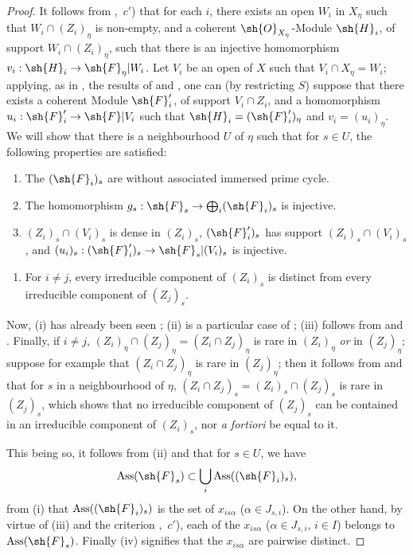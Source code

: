 \begin{proof}
\label{IV.9.8.3-proof}
It follows from ,~$c'$) that for each $i$, there exists an open $W_i$ in $X_\eta$ such that $W_i\cap(Z_i)_\eta$ is non-empty, and a coherent $\sh{O}_{X_\eta}$-Module $\sh{H}_i$, of support $W_i\cap(Z_i)_\eta$, such that there is an injective homomorphism $v_i:\sh{H}_i\to\sh{F}_\eta|W_i$.
Let $V_i$ be an open of $X$ such that $V_i\cap X_\eta=W_i$; applying, as in , the results of  and , one can (by restricting $S$) suppose that there exists a coherent Module $\sh{F}'_i$, of support $V_i\cap Z_i$, and a homomorphism $u_i:\sh{F}'_i\to\sh{F}|V_i$ such that $\sh{H}_i=(\sh{F}'_i)_\eta$ and $v_i=(u_i)_\eta$.
We will show that there is a neighbourhood $U$ of $\eta$ such that for $s\in U$, the following properties are satisfied:
\begin{enumerate}[label=(\roman*)]
  \item The $(\sh{F}_i)_s$ are without associated immersed prime cycle.
  \item The homomorphism $g_s:\sh{F}_s\to\bigoplus_i(\sh{F}_i)_s$ is injective.
  \item $(Z_i)_s\cap(V_i)_s$ is dense in $(Z_i)_s$, $(\sh{F}'_i)_s$ has support $(Z_i)_s\cap(V_i)_s$, and $(u_i)_s:(\sh{F}'_i)_s\to\sh{F}_s|(V_i)_s$ is injective.
\end{enumerate}

\begin{enumerate}[label=(\roman*)]
  \item[(iv)] For $i\neq j$, every irreducible component of $(Z_i)_s$ is distinct from every irreducible component of $(Z_j)_s$.
\end{enumerate}

Now, (i) has already been seen ; (ii) is a particular case of ; (iii) follows from  and .
Finally, if $i\neq j$, $(Z_i)_\eta\cap(Z_j)_\eta=(Z_i\cap Z_j)_\eta$ is rare in $(Z_i)_\eta$ \emph{or} in $(Z_j)_\eta$; suppose for example that $(Z_i\cap Z_j)_\eta$ is rare in $(Z_j)_\eta$; then it follows from  and  that for $s$ in a neighbourhood of $\eta$, $(Z_i\cap Z_j)_s=(Z_i)_s\cap(Z_j)_s$ is rare in $(Z_j)_s$, which shows that no irreducible component of $(Z_j)_s$ can be contained in an irreducible component of $(Z_i)_s$, nor \emph{a fortiori} be equal to it.

This being so, it follows from (ii) and  that for $s\in U$, we have
\[
  \operatorname{Ass}(\sh{F}_s)\subset\bigcup_i\operatorname{Ass}((\sh{F}_i)_s),
\]
from (i) that $\operatorname{Ass}((\sh{F}_i)_s)$ is the set of $x_{is\alpha}$ ($\alpha\in J_{s,i}$).
On the other hand, by virtue of (iii) and the criterion ,~$c'$), each of the $x_{is\alpha}$ ($\alpha\in J_{s,i}$, $i\in I$) belongs to $\operatorname{Ass}(\sh{F}_s)$.
Finally (iv) signifies that the $x_{is\alpha}$ are pairwise distinct.


\end{proof}
